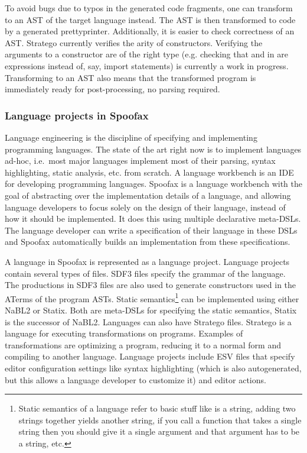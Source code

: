 To avoid bugs due to typos in the generated code fragments, one can transform to an \ac{AST} of the target language instead.
The \ac{AST} is then transformed to code by a generated prettyprinter.
Additionally, it is easier to check correctness of an \ac{AST}.
Stratego currently verifies the arity of constructors.
Verifying the arguments to a constructor are of the right type (e.g. checking that  and  in  are expressions instead of, say, import statements) is currently a work in progress.
Transforming to an \ac{AST} also means that the transformed program is immediately ready for post-processing, no parsing required.

\subsubsection{Language projects in Spoofax}
\label{subsubsec:problem_analysis__background__spoofax_language_projects}

Language engineering is the discipline of specifying and implementing programming languages.
The state of the art right now is to implement languages ad-hoc, i.e.\ most major languages implement most of their parsing, syntax highlighting, static analysis, etc. from scratch.
A language workbench is an \ac{IDE} for developing programming languages.
Spoofax is a language workbench with the goal of abstracting over the implementation details of a language, and allowing language developers to focus solely on the design of their language, instead of how it should be implemented.
It does this using multiple declarative meta-\acp{DSL}.
The language developer can write a specification of their language in these \acp{DSL} and Spoofax automatically builds an implementation from these specifications.

A language in Spoofax is represented as a language project.
Language projects contain several types of files.
\Ac{SDF3} files specify the grammar of the language.
The productions in \ac{SDF3} files are also used to generate constructors used in the ATerms of the program \acp{AST}.
Static semantics\footnote{Static semantics of a language refer to basic stuff like  is a string, adding two strings together yields another string, if you call a function that takes a single string then you should give it a single argument and that argument has to be a string, etc.}
can be implemented using either \ac{NaBL2} or Statix.
Both are meta-\acp{DSL} for specifying the static semantics, Statix is the successor of \ac{NaBL2}.
Languages can also have Stratego files.
Stratego is a language for executing transformations on programs.
Examples of transformations are optimizing a program, reducing it to a normal form and compiling to another language.
Language projects include \ac{ESV} files that specify editor configuration settings like syntax highlighting (which is also autogenerated, but this allows a language developer to customize it) and editor actions.


